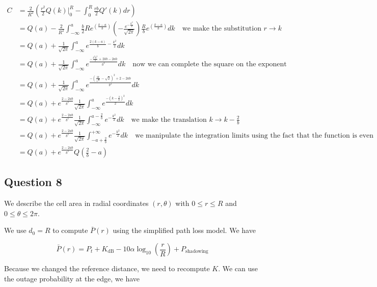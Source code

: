 \documentclass[]{article}
\begin{document}
	\begin{align}
		C &= \frac{2}{R^2}\left(\frac{r^2}{2}Q(k)\big|_0^R - \int_{0}^{R} \frac{rb}{2} Q'(k) dr \right) \\
		&= Q(a) - \frac{2}{R^2} \int_{-\infty}^{a} \frac{b}{2}R e^{\left(\frac{k-a}{b}\right)} \left(-\frac{e^{-\frac{k^2}{2}}}{\sqrt{2\pi}}\right)\frac{R}{b}e^{\left(\frac{k-a}{b}\right)}dk \quad \text{we make the substitution $r \to k$} \\
		&= Q(a) + \frac{1}{\sqrt{2\pi}}\int_{-\infty}^{a} e^{\frac{2(k-a)}{b} - \frac{k^2}{2}} dk \\
		&= Q(a) + \frac{1}{\sqrt{2\pi}}\int_{-\infty}^{a} e^{\frac{-\frac{b^2k^2}{2} + 2kb - 2ab}{b^2}} dk \quad \text{now we can complete the square on the exponent} \\
		&= Q(a) + \frac{1}{\sqrt{2\pi}}\int_{-\infty}^{a} e^{\frac{-\left(\frac{bk}{\sqrt{2}} - \sqrt{2}\right)^2 + 2 -2ab}{b^2}} dk \\
		&= Q(a) + e^{\frac{2 - 2ab}{b^2}}\frac{1}{\sqrt{2\pi}}\int_{-\infty}^{a} e^{\frac{-\left(k - \frac{2}{b}\right)^2}{2}} dk \\
		&= Q(a) + e^{\frac{2 - 2ab}{b^2}}\frac{1}{\sqrt{2\pi}}\int_{-\infty}^{a-\frac{2}{b}} e^{-\frac{k^2}{2}} dk \quad \text{we make the translation $k \to k - \frac{2}{b} $} \\
		&= Q(a) + e^{\frac{2 - 2ab}{b^2}}\frac{1}{\sqrt{2\pi}}\int_{-a+\frac{2}{b}}^{+\infty} e^{-\frac{k^2}{2}} dk \quad \text{we manipulate the integration limits using the fact that the function is even}\\
		&= Q(a) + e^{\frac{2 - 2ab}{b^2}}Q\left(\frac{2}{b} - a\right)
	\end{align}
	
	\subsection*{Question 8}
	
	We describe the cell area in radial coordinates $(r, \theta)$ with $0\leq r\leq R$ and $0 \leq \theta \leq 2\pi$.
	
	We use $d_0 = R$ to compute $\bar{P}(r)$ using the simplified path loss model. We have
	
	\begin{equation}
		\bar{P}(r) = P_t + K_{\text{dB}} - 10\alpha\log_{10}\left(\frac{r}{R}\right) + P_{\text{shadowing}}
	\end{equation}
	
	Because we changed the reference distance, we need to recompute $K$. We can use the outage probability at the edge, we have
	
\end{document}
